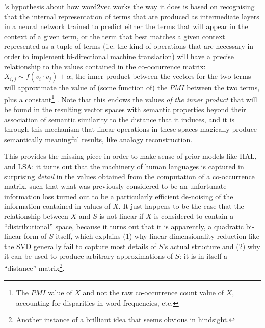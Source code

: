 \citeauthor{goldberg2014}'s hypothesis about how word2vec works the way it does is based on recognising that the internal representation of terms that are produced as intermediate layers in a neural network trained to predict either the terms that will appear in the context of a given term, or the term that best matches a given context represented as a tuple of terms (i.e. the kind of operations that are necessary in order to implement bi-directional machine translation) will have a precise relationship to the values contained in the co-occurrence matrix: $X_{i,j} \sim f( v_{i} \cdot v_{j} ) + \alpha$, the inner product between the vectors for the two terms will approximate the value of (some function of) the $PMI$ between the two terms, plus a constant\footnote{
    The $PMI$ value of $X$ and not the raw co-occurrence count value of $X$, accounting for disparities in word frequencies, etc.
} \citep{levy2014}.
Note that this endows the values \emph{of the inner product} that will be found in the resulting vector spaces with semantic properties beyond their association of semantic similarity to the distance that it induces, and it is through this mechanism that linear operations in these spaces magically produce semantically meaningful results, like analogy reconstruction.

This provides the missing piece in order to make sense of prior models like HAL, and LSA: it turns out that the machinery of human languages is captured in surprising \emph{detail} in the values obtained from the computation of a co-occurrence matrix, such that what was previously considered to be an unfortunate information loss turned out to be a particularly efficient de-noising of the information contained in values of $X$.
It just happens to be the case that the relationship between $X$ and $S$ is not linear if $X$ is considered to contain a ``distributional'' space, because it turns out that it is apparently, a quadratic bi-linear form of $S$ itself, which explains (1) why linear dimensionality reduction like the SVD generally fail to capture most details of $S$'s actual structure and (2) why it can be used to produce arbitrary approximations of $S$: it is in itself a ``distance'' matrix\footnote{
    Another instance of a brilliant idea that seems obvious in hindsight.
}.

